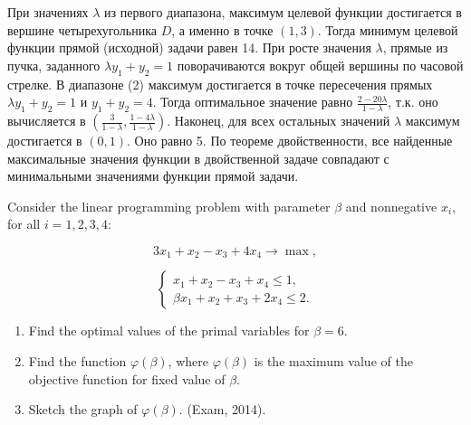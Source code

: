 \begin{solution}
При значениях $\lambda $ из первого диапазона, максимум целевой функции достигается в вершине четырехугольника $D$, а именно в точке $(1,3)$. Тогда минимум целевой функции прямой (исходной) задачи равен 14. При росте значения $\lambda $, прямые из пучка, заданного $\lambda y_{1} +y_{2} =1$ поворачиваются вокруг общей вершины по часовой стрелке. В диапазоне (2) максимум достигается в точке пересечения прямых $\lambda y_{1} +y_{2} =1$ и $y_{1} +y_{2} =4$. Тогда оптимальное значение  равно $\frac{2-20\lambda }{1-\lambda } $, т.к. оно вычисляется в $(\frac{3}{1-\lambda } ,  \frac{1-4\lambda }{1-\lambda } )$. Наконец, для всех остальных значений $\lambda $ максимум достигается в $(0,1).$ Оно равно 5. По теореме двойственности, все найденные максимальные значения функции в двойственной задаче совпадают с минимальными значениями функции прямой задачи.
\end{solution}

\begin{problem}
Consider the linear programming problem with parameter $\beta $ and nonnegative $x_{i} $, for all $i=1, 2, 3, 4$:

\[3x_{1} +x_{2} -x_{3} +4x_{4} \to \max ,\] 

\[
\begin{cases}
x_{1} +x_{2} -x_{3} +x_{4} \le 1, \\
\beta x_{1} +x_{2} +x_{3} +2x_{4} \le 2.
\end{cases}
\]

\begin{enumerate}
\item  Find the optimal values of the primal variables for $\beta =6$.

\item  Find the function $\varphi (\beta )$, where $\varphi (\beta )$ is the maximum value of the objective function for fixed value of $\beta $.

\item  Sketch the graph of $\varphi (\beta )$.  (Exam, 2014).
\end{enumerate}
\end{problem}


